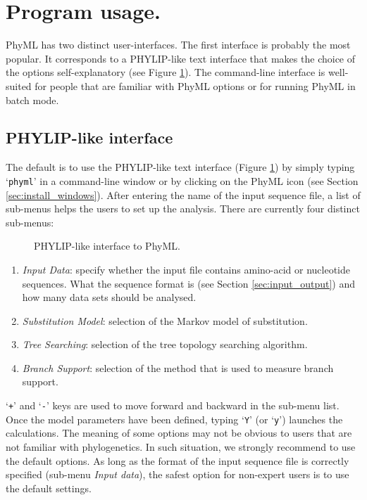 \documentclass[a4paper,12pt]{article}
\newcommand{\x}[1]{\texttt{#1}}
\begin{document}
\section{Program usage.}\label{sec:phyml_new}

PhyML  has two distinct  user-interfaces.  The  first interface  is probably  the most  popular.  It
corresponds to  a PHYLIP-like text interface that  makes the choice of  the options self-explanatory
(see  Figure \ref{fig:interface}). The  command-line interface  is well-suited  for people  that are
familiar with PhyML options or for running PhyML in batch mode.

\subsection{PHYLIP-like interface}

The default is  to use the PHYLIP-like text interface (Figure  \ref{fig:interface}) by simply typing
`\x{phyml}'  in   a  command-line   window  or  by   clicking  on   the  PhyML  icon   (see  Section
\ref{sec:install_windows}).  After entering the name of the input sequence file, a list of sub-menus
helps the users to set up the analysis.  There are currently four distinct sub-menus:

\begin{figure}
\caption{PHYLIP-like interface to PhyML.}
\label{fig:interface}
\end{figure}

\begin{enumerate}

\item  {\em  Input  Data}:  specify  whether  the  input  file  contains  amino-acid  or  nucleotide
sequences. What the  sequence format is (see Section \ref{sec:input_output}) and  how many data sets
should be analysed.

\item  {\em  Substitution  Model}: selection  of  the  Markov  model  of substitution.

\item  {\em  Tree Searching}:  selection  of  the tree  topology  searching  algorithm.

\item {\em  Branch Support}: selection  of the method  that is used  to measure branch  support.

\end{enumerate}
\noindent `\x{+}' and `\x{-}' keys are used to  move forward and backward in the sub-menu list. Once
the model parameters  have been defined, typing `\x{Y}' (or `\x{y}')  launches the calculations. The
meaning of  some options may not  be obvious to users  that are not familiar  with phylogenetics. In
such situation, we strongly recommend to use the default options. As long as the format of the input
sequence file is  correctly specified (sub-menu {\em Input data}), the  safest option for non-expert
users is to use the default settings.
\end{document}
